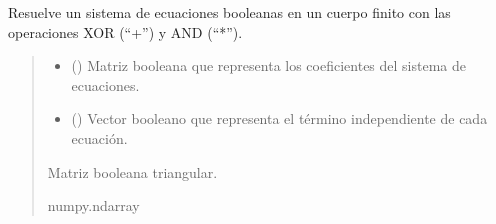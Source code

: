 \documentclass[letterpaper,10pt,english]{sphinxmanual}
\begin{document}

\begin{fulllineitems}
\label{\detokenize{utils.bool:utils.bool.gauss_elimination_gf2}}
\pysigstartsignatures
{}
\pysigstopsignatures
\sphinxAtStartPar
Resuelve un sistema de ecuaciones booleanas en un cuerpo finito con las operaciones XOR (“+”) y AND (“*”).
\begin{quote}\begin{description}
\begin{itemize}
\item {} 
\sphinxAtStartPar
{} () \textendash{} Matriz booleana que representa los coeficientes del sistema de ecuaciones.

\item {} 
\sphinxAtStartPar
{} () \textendash{} Vector booleano que representa el término independiente de cada ecuación.

\end{itemize}

\sphinxAtStartPar
Matriz booleana triangular.

\sphinxAtStartPar
numpy.ndarray

\end{description}\end{quote}

\end{fulllineitems}

\end{document}
